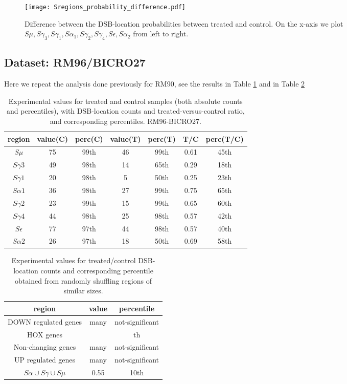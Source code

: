 \documentclass[11pt,a4paper]{article}
\begin{document}
\begin{figure}[hbtp]
\centering
\texttt{[image: Sregions\_probability\_difference.pdf]}
\caption{Difference between the DSB-location probabilities between treated and control. On the x-axis we plot $S\mu,S\gamma_3,S\gamma_1,S\alpha_1,S\gamma_2,S\gamma_4,S\epsilon,S\alpha_2$ from left to right.}
\label{fig:Sregions_probability_difference}
\end{figure}

\subsection{Dataset: RM96/BICRO27}
Here we repeat the analysis done previously for RM90, see the results in Table \ref{tab:rm96_IGHregions_enrichment} and in Table \ref{tab:rm96_larger_regions}

\begin{table}
\centering
\begin{tabular}{|c|c|c|c|c|c|c|}
\hline 
region & value(C) & perc(C) & value(T) & perc(T) & T/C & perc(T/C) \\ 
\hline 
$S\mu$ & 75 & 99th & 46  & 99th & 0.61 & 45th\\
\hline
$S\gamma3$ & 49 & 98th & 14  & 65th & 0.29 & 18th\\
\hline
$S\gamma1$ & 20 & 98th & 5  & 50th & 0.25 & 23th\\
\hline
$S\alpha1$ & 36 & 98th & 27 & 99th & 0.75 & 65th\\
\hline
$S\gamma2$ & 23 & 99th & 15  & 99th & 0.65 & 60th\\
\hline
$S\gamma4$ & 44 & 98th & 25 & 98th & 0.57 & 42th\\
\hline
$S\epsilon$ & 77 & 97th & 44 & 98th & 0.57 & 40th\\
\hline
$S\alpha2$ & 26 & 97th & 18 & 50th & 0.69 & 58th\\
\hline
\end{tabular} 
\caption{Experimental values for treated and control samples (both absolute counts and percentiles), with DSB-location counts and treated-versus-control ratio, and corresponding percentiles. RM96-BICRO27.}
\label{tab:rm96_IGHregions_enrichment}
\end{table}

\begin{table}
\centering
\begin{tabular}{|c|c|c|}
\hline 
region & value & percentile \\ 
\hline 
DOWN regulated genes & many & not-significant \\ 
\hline 
HOX genes &  & th \\ 
\hline 
Non-changing genes & many & not-significant \\ 
\hline 
UP regulated genes & many & not-significant \\ 
\hline 
$S\alpha \cup S\gamma \cup S\mu$ & 0.55 & 10th \\ 
\hline 
\end{tabular} 
\caption{Experimental values for treated/control DSB-location counts and corresponding percentile obtained from randomly shuffling regions of similar sizes.}
\label{tab:rm96_larger_regions}
\end{table}
\end{document}
